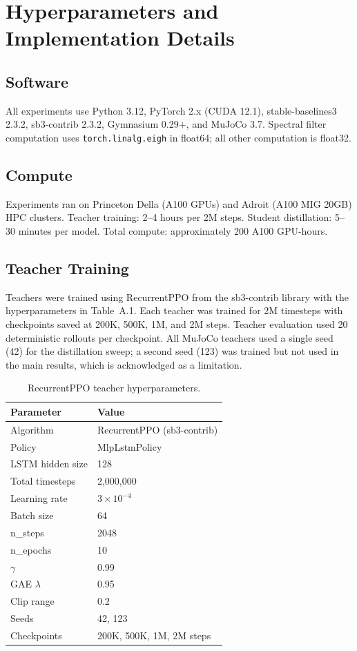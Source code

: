\begingroup
\singlespacing
\chapter{Hyperparameters and Implementation Details}
\label{app:hyperparams}

\section{Software}

All experiments use Python 3.12, PyTorch 2.x (CUDA 12.1), stable-baselines3 2.3.2, sb3-contrib 2.3.2, Gymnasium 0.29+, and MuJoCo 3.7.
Spectral filter computation uses \texttt{torch.linalg.eigh} in float64; all other computation is float32.

\section{Compute}

Experiments ran on Princeton Della (A100 GPUs) and Adroit (A100 MIG 20GB) HPC clusters.
Teacher training: 2--4 hours per 2M steps.
Student distillation: 5--30 minutes per model.
Total compute: approximately 200 A100 GPU-hours.

\section{Teacher Training}

Teachers were trained using RecurrentPPO from the sb3-contrib library with the hyperparameters in Table~A.1.
Each teacher was trained for 2M timesteps with checkpoints saved at 200K, 500K, 1M, and 2M steps.
Teacher evaluation used 20 deterministic rollouts per checkpoint.
All MuJoCo teachers used a single seed (42) for the distillation sweep; a second seed (123) was trained but not used in the main results, which is acknowledged as a limitation.

\begin{table}[ht]
\centering
\caption{RecurrentPPO teacher hyperparameters.}
\begin{tabular}{ll}
\toprule
Parameter & Value \\
\midrule
Algorithm & RecurrentPPO (sb3-contrib) \\
Policy & MlpLstmPolicy \\
LSTM hidden size & 128 \\
Total timesteps & 2{,}000{,}000 \\
Learning rate & $3 \times 10^{-4}$ \\
Batch size & 64 \\
n\_steps & 2048 \\
n\_epochs & 10 \\
$\gamma$ & 0.99 \\
GAE $\lambda$ & 0.95 \\
Clip range & 0.2 \\
Seeds & 42, 123 \\
Checkpoints & 200K, 500K, 1M, 2M steps \\
\bottomrule
\end{tabular}
\end{table}

